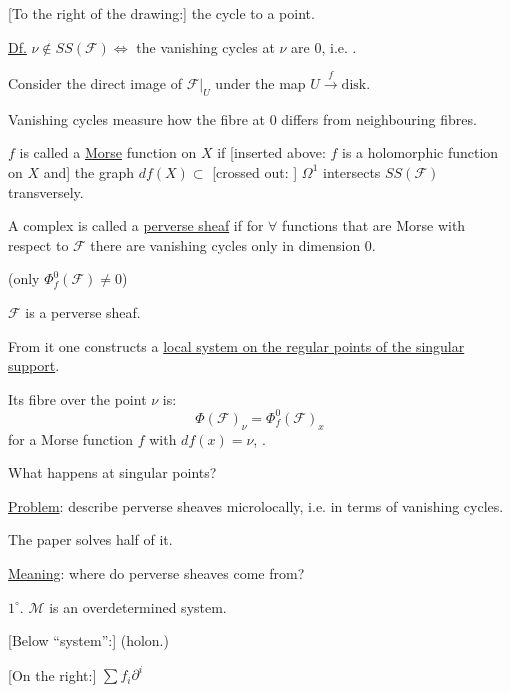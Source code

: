 

[To the right of the drawing:] the cycle  to a point.

\underline{Df.} $\nu\notin SS(\mathcal F)\Longleftrightarrow$ the vanishing cycles at $\nu$ are $0$, i.e. .

Consider the direct image of $\mathcal F|_U$ under the map $U\overset{f}{\longrightarrow}\text{disk}$.

Vanishing cycles measure how the fibre at $0$ differs from neighbouring fibres.

$f$ is called a \underline{Morse} function on $X$ if [inserted above: $f$ is a holomorphic function on $X$ and] the graph $df(X)\subset$ [crossed out: ] $\Omega^1$ intersects $SS(\mathcal F)$ transversely.

A complex is called a \underline{perverse sheaf} if for $\forall$ functions that are Morse with respect to $\mathcal F$ there are vanishing cycles only in dimension $0$.

(only $\Phi_f^0(\mathcal F)\neq0$)

$\mathcal F$ is a perverse sheaf.

From it one constructs a \underline{local system on the regular points of the singular support}.

Its fibre over the point $\nu$ is:
\begin{equation*}
\Phi(\mathcal F)_\nu=\Phi_f^0(\mathcal F)_x
\end{equation*}
for a Morse function $f$ with $df(x)=\nu$, .

What happens at singular points?

\underline{Problem}: describe perverse sheaves microlocally,
i.e. in terms of vanishing cycles.

The paper solves half of it.

\underline{Meaning}: where do perverse sheaves come from?

$1^\circ$. $\mathcal M$ is an overdetermined system.

[Below “system”:] (holon.)

[On the right:] $\sum f_i\partial^i$

